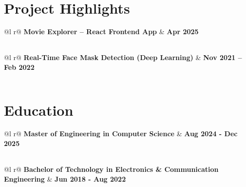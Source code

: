 \documentclass[a4paper,10pt]{article}
\begin{document}
\section{Project Highlights}

\begin{tabularx}{\linewidth}{ @{}l r@{} }
\textbf{Movie Explorer – React Frontend App} & \hfill \textbf{Apr 2025} \\[3.75pt]
  \\
\end{tabularx}

\begin{tabularx}{\linewidth}{ @{}l r@{} }
\textbf{Real-Time Face Mask Detection (Deep Learning)} & \hfill \textbf{Nov 2021 – Feb 2022} \\[3.75pt]
  \\
\end{tabularx}


\section{Education}

\begin{tabularx}{\linewidth}{ @{}l r@{} }
\textbf{Master of Engineering in Computer Science} & \hfill \textbf{Aug 2024 - Dec 2025} \\[3.75pt]
  \\
\end{tabularx}

\begin{tabularx}{\linewidth}{ @{}l r@{} }
\textbf{Bachelor of Technology in Electronics \& Communication Engineering} & \hfill \textbf{Jun 2018 - Aug 2022} \\[3.75pt]
  \\
\end{tabularx}
\end{document}
